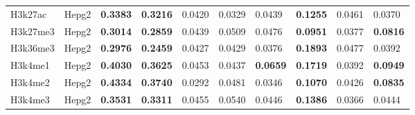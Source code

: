 \begin{table}[!ht]
\begin{tabular}{ll|ll|ll|ll|ll}
H3k27ac                              & Hepg2                                  & {\color[HTML]{CB0000} \textbf{0.3383}}                       & {\color[HTML]{CB0000} \textbf{0.3216}}                      & 0.0420                                & 0.0329                               & 0.0439                                & {\color[HTML]{CB0000} \textbf{0.1255}} & 0.0461                                & 0.0370                                 \\
H3k27me3                             & Hepg2                                  & {\color[HTML]{CB0000} \textbf{0.3014}}                       & {\color[HTML]{CB0000} \textbf{0.2859}}                      & 0.0439                                & 0.0509                               & 0.0476                                & \textbf{0.0951}                        & 0.0377                                & \textbf{0.0816}                        \\
H3k36me3                             & Hepg2                                  & {\color[HTML]{CB0000} \textbf{0.2976}}                       & {\color[HTML]{CB0000} \textbf{0.2459}}                      & 0.0427                                & 0.0429                               & 0.0376                                & {\color[HTML]{CB0000} \textbf{0.1893}} & 0.0477                                & 0.0392                                 \\
H3k4me1                              & Hepg2                                  & {\color[HTML]{CB0000} \textbf{0.4030}}                       & {\color[HTML]{CB0000} \textbf{0.3625}}                      & 0.0453                                & 0.0437                               & \textbf{0.0659}                       & {\color[HTML]{CB0000} \textbf{0.1719}} & 0.0392                                & \textbf{0.0949}                        \\
H3k4me2                              & Hepg2                                  & {\color[HTML]{CB0000} \textbf{0.4334}}                       & {\color[HTML]{CB0000} \textbf{0.3740}}                      & 0.0292                                & 0.0481                               & 0.0346                                & {\color[HTML]{CB0000} \textbf{0.1070}} & 0.0426                                & \textbf{0.0835}                        \\
H3k4me3                              & Hepg2                                  & {\color[HTML]{CB0000} \textbf{0.3531}}                       & {\color[HTML]{CB0000} \textbf{0.3311}}                      & 0.0455                                & 0.0540                               & 0.0446                                & {\color[HTML]{CB0000} \textbf{0.1386}} & 0.0366                                & 0.0444                                 \\

\end{tabular}
\end{table}
